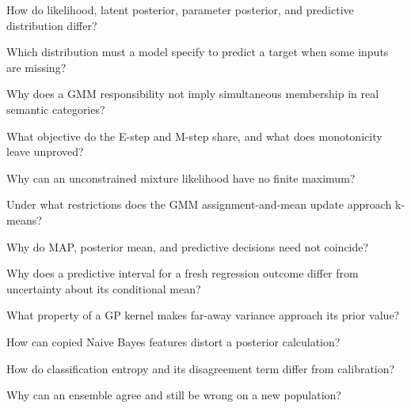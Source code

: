 \begin{studyquestions}
\item How do likelihood, latent posterior, parameter posterior, and predictive distribution differ?
\item Which distribution must a model specify to predict a target when some inputs are missing?
\item Why does a GMM responsibility not imply simultaneous membership in real semantic categories?
\item What objective do the E-step and M-step share, and what does monotonicity leave unproved?
\item Why can an unconstrained mixture likelihood have no finite maximum?
\item Under what restrictions does the GMM assignment-and-mean update approach k-means?
\item Why do MAP, posterior mean, and predictive decisions need not coincide?
\item Why does a predictive interval for a fresh regression outcome differ from uncertainty about its conditional mean?
\item What property of a GP kernel makes far-away variance approach its prior value?
\item How can copied Naive Bayes features distort a posterior calculation?
\item How do classification entropy and its disagreement term differ from calibration?
\item Why can an ensemble agree and still be wrong on a new population?
\end{studyquestions}

